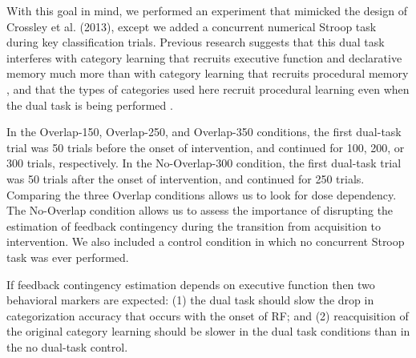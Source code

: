 \documentclass[apacite,draftfirst,man]{apa6}
\begin{document}

With this goal in mind, we performed an experiment that mimicked the design of
Crossley et al. (2013), except we added a concurrent numerical Stroop task
during key classification trials. Previous research suggests that this dual task
interferes with category learning that recruits executive function and
declarative memory much more than with category learning that recruits
procedural memory \cite{WaldronAshby2001, crossley2016declarative}, and that the
types of categories used here recruit procedural learning even when the
dual task is being performed \cite{crossley2016declarative}.

In the Overlap-150, Overlap-250, and Overlap-350 conditions, the first dual-task
trial was 50 trials before the onset of intervention, and continued for 100,
200, or 300 trials, respectively. In the No-Overlap-300 condition, the first
dual-task trial was 50 trials after the onset of intervention, and continued for
250 trials. Comparing the three Overlap conditions allows us to look for dose
dependency. The No-Overlap condition allows us to assess the importance of
disrupting the estimation of feedback contingency during the transition from
acquisition to intervention. We also included a control condition in which no
concurrent Stroop task was ever performed.


If feedback contingency estimation depends on executive function then two
behavioral markers are expected: (1) the dual task should slow the drop in
categorization accuracy that occurs with the onset of RF; and (2) reacquisition
of the original category learning should be slower in the dual task conditions
than in the no dual-task control.
\end{document}
